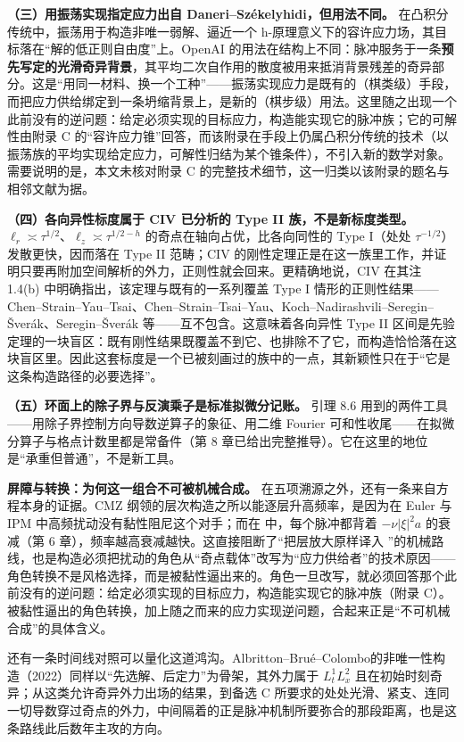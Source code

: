 \textbf{（三）用振荡实现指定应力出自 Daneri--Székelyhidi，但用法不同。} 在凸积分传统中，振荡用于构造非唯一弱解、逼近一个 h-原理意义下的容许应力场，其目标落在“解的低正则自由度”上\cite{ds}。OpenAI 的用法在结构上不同：脉冲服务于一条\textbf{预先写定的光滑奇异背景}，其平均二次自作用的散度被用来抵消背景残差的奇异部分。这是“用同一材料、换一个工种”——振荡实现应力是既有的（棋类级）手段，而把应力供给绑定到一条坍缩背景上，是新的（棋步级）用法。这里随之出现一个此前没有的逆问题：给定必须实现的目标应力，构造能实现它的脉冲族；它的可解性由附录 C 的“容许应力锥”回答，而该附录在手段上仍属凸积分传统的技术（以振荡族的平均实现给定应力，可解性归结为某个锥条件），不引入新的数学对象。需要说明的是，本文未核对附录 C 的完整技术细节，这一归类以该附录的题名与相邻文献为据。

\textbf{（四）各向异性标度属于 CIV 已分析的 Type II 族，不是新标度类型。} $\ell_{r}\asymp\tau^{1/2}$、$\ell_{z}\asymp\tau^{1/2-h}$ 的奇点在轴向占优，比各向同性的 Type I（处处 $\tau^{-1/2}$）发散更快，因而落在 Type II 范畴；CIV 的刚性定理正是在这一族里工作，并证明只要再附加空间解析的外力，正则性就会回来\cite{civ}。更精确地说，CIV 在其注 1.4(b) 中明确指出，该定理与既有的一系列覆盖 Type I 情形的正则性结果——Chen--Strain--Yau--Tsai、Chen--Strain--Tsai--Yau、Koch--Nadirashvili--Seregin--Šverák、Seregin--Šverák 等——互不包含。这意味着各向异性 Type II 区间是先验定理的一块盲区：既有刚性结果既覆盖不到它、也排除不了它，而构造恰恰落在这块盲区里。因此这套标度是一个已被刻画过的族中的一点，其新颖性只在于“它是这条构造路径的必要选择”。

\textbf{（五）环面上的除子界与反演乘子是标准拟微分记账。} 引理 8.6 用到的两件工具——用除子界控制方向导数逆算子的象征、用二维 Fourier 可和性收尾——在拟微分算子与格点计数里都是常备件（第 8 章已给出完整推导）。它在这里的地位是“承重但普通”，不是新工具。

\textbf{屏障与转换：为何这一组合不可被机械合成。} 在五项溯源之外，还有一条来自方程本身的证据。CMZ 纲领的层次构造之所以能逐层升高频率，是因为在 Euler 与 IPM 中高频扰动没有黏性阻尼这个对手；而在 \NS{} 中，每个脉冲都背着 $-\nu|\xi|^{2}a$ 的衰减（第 6 章），频率越高衰减越快。这直接阻断了“把层放大原样译入 \NS{}”的机械路线，也是构造必须把扰动的角色从“奇点载体”改写为“应力供给者”的技术原因——角色转换不是风格选择，而是被黏性逼出来的。角色一旦改写，就必须回答那个此前没有的逆问题：给定必须实现的目标应力，构造能实现它的脉冲族（附录 C）。被黏性逼出的角色转换，加上随之而来的应力实现逆问题，合起来正是“不可机械合成”的具体含义。

还有一条时间线对照可以量化这道鸿沟。Albritton--Brué--Colombo\cite{abc}的非唯一性构造（2022）同样以“先选解、后定力”为骨架，其外力属于 $L_{t}^{1}L_{x}^{2}$ 且在初始时刻奇异；从这类允许奇异外力出场的结果，到备选 C 所要求的处处光滑、紧支、连同一切导数穿过奇点的外力，中间隔着的正是脉冲机制所要弥合的那段距离，也是这条路线此后数年主攻的方向。


